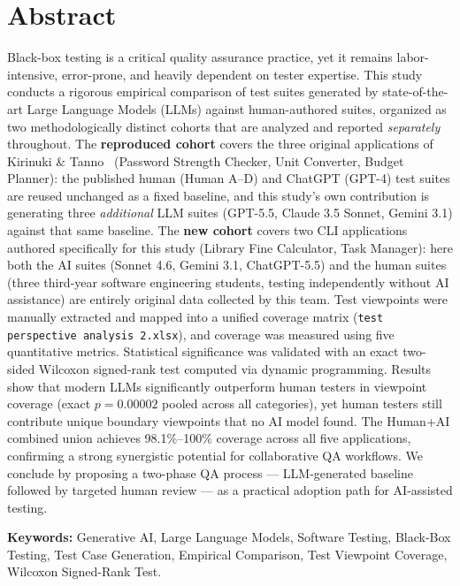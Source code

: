 \documentclass[12pt,a4paper]{article}
\begin{document}
\section*{Abstract}
Black-box testing is a critical quality assurance practice, yet it remains labor-intensive, error-prone, and heavily dependent on tester expertise. This study conducts a rigorous empirical comparison of test suites generated by state-of-the-art Large Language Models (LLMs) against human-authored suites, organized as two methodologically distinct cohorts that are analyzed and reported \emph{separately} throughout. The \textbf{reproduced cohort} covers the three original applications of Kirinuki \& Tanno~\cite{b1} (Password Strength Checker, Unit Converter, Budget Planner): the published human (Human A--D) and ChatGPT (GPT-4) test suites are reused unchanged as a fixed baseline, and this study's own contribution is generating three \emph{additional} LLM suites (GPT-5.5, Claude 3.5 Sonnet, Gemini 3.1) against that same baseline. The \textbf{new cohort} covers two CLI applications authored specifically for this study (Library Fine Calculator, Task Manager): here both the AI suites (Sonnet 4.6, Gemini 3.1, ChatGPT-5.5) and the human suites (three third-year software engineering students, testing independently without AI assistance) are entirely original data collected by this team. Test viewpoints were manually extracted and mapped into a unified coverage matrix (\texttt{test perspective analysis 2.xlsx}), and coverage was measured using five quantitative metrics. Statistical significance was validated with an exact two-sided Wilcoxon signed-rank test computed via dynamic programming. Results show that modern LLMs significantly outperform human testers in viewpoint coverage (exact $p = 0.00002$ pooled across all categories), yet human testers still contribute unique boundary viewpoints that no AI model found. The Human+AI combined union achieves 98.1\%--100\% coverage across all five applications, confirming a strong synergistic potential for collaborative QA workflows. We conclude by proposing a two-phase QA process --- LLM-generated baseline followed by targeted human review --- as a practical adoption path for AI-assisted testing.

\vspace{0.3cm}
\noindent\textbf{Keywords:} Generative AI, Large Language Models, Software Testing, Black-Box Testing, Test Case Generation, Empirical Comparison, Test Viewpoint Coverage, Wilcoxon Signed-Rank Test.

\clearpage
\tableofcontents
\clearpage
\end{document}
